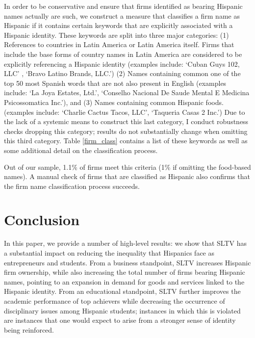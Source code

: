 \documentclass[11pt]{article}
\begin{document}
In order to be conservative and ensure that firms identified as bearing Hispanic names actually are such, we construct a measure that classifies a firm name as Hispanic if it contains certain keywords that are explicitly associated with a Hispanic identity. These keywords are split into three major categories: (1) References to countries in Latin America or Latin America itself. Firms that include the base forms of country names in Latin America are considered to be explicitly referencing a Hispanic identity (examples include: `Cuban Guys 102, LLC' , `Bravo Latino Brands, LLC.') (2) Names containing common one of the top 50 most Spanish words that are not also present in English (examples include: `La Joya Estates, Ltd.', `Conselho Nacional De Saude Mental E Medicina Psicossomatica Inc.'), and (3) Names containing common Hispanic foods. (examples include: `Charlie Cactus Tacos, LLC', `Taqueria Casas 2 Inc.') Due to the lack of a systemic means to construct this last category, I conduct robustness checks dropping this category; results do not substantially change when omitting this third category. Table \ref{firm_class} contains a list of these keywords as well as some additional detail on the classification process.

Out of our sample, 1.1\% of firms meet this criteria (1\% if omitting the food-based names). A manual check of firms that are classified as Hispanic also confirms that the firm name classification process succeeds.





\section{Conclusion} \label{s:conclusion}

In this paper, we provide a number of high-level results: we show that SLTV has a substantial impact on reducing the inequality that Hispanics face as entrepreneurs and students. From a business standpoint, SLTV increases Hispanic firm ownership, while also increasing the total number of firms bearing Hispanic names, pointing to an expansion in demand for goods and services linked to the Hispanic identity. From an educational standpoint, SLTV further improves the academic performance of top achievers while decreasing the occurrence of disciplinary issues among Hispanic students; instances in which this is violated are instances that one would expect to arise from a stronger sense of identity being reinforced. 
\end{document}
